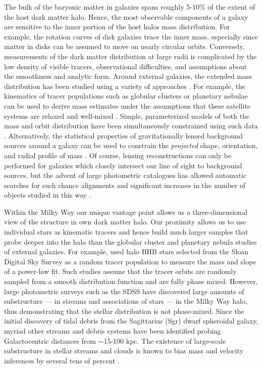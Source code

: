 \documentclass[letterpaper,12pt,preprint]{aastex}
\begin{document}
The bulk of the baryonic matter in galaxies spans roughly 5-10\% of the extent of the host dark matter halo. Hence, the most observable components of a galaxy are sensitive to the inner portion of the host halos mass distribution. For example, the rotation curves of disk galaxies trace the inner mass, especially since matter in disks can be assumed to move on nearly circular orbits. Conversely, measurements of the dark matter distribution at large radii is complicated by the low density of visible tracers, observational difficulties, and assumptions about the smoothness and analytic form. Around external galaxies, the extended mass distribution has been studied using a variety of approaches \citep[see][for a a complete and detailed review]{courteau13}. For example, the kinematics of tracer populations such as globular clusters or planetary nebulae can be used to derive mass estimates under the assumptions that these satellite systems are relaxed and well-mixed \citep[early investigations include][]{mendez01,cote03}. Simple, parameterized models of both the mass and orbit distribution have been simultaneously constrained using such data \citep[e.g.][]{napolitano11,deason12c}. 
Alternatively, the statistical properties of gravitationally lensed background sources around a galaxy can be used to constrain the \emph{projected} shape, orientation, and radial profile of mass \citep[see, for example, the Lens Structure and Dynamics Survey described in][]{koopmans02}. Of course, lensing reconstructions can only be performed for galaxies which closely intersect our line of sight to background sources, but the advent of large photometric catalogues has allowed automatic searches for such chance alignments and significant increases in the number of objects studied in this way \citep[e.g. the Sloan Lens ACS Survey, see][]{bolton06}.

Within the Milky Way our unique vantage point allows us a three-dimensional view of the structure in own dark matter halo. Our proximity allows us to use individual stars as kinematic tracers and hence build much larger samples that probe deeper into the halo than the globular cluster and planetary nebula studies of external galaxies. For example, \cite{deason12a} used halo BHB stars selected from the Sloan Digital Sky Survey \cite[SDSS;][]{york00} as a random tracer population to measure the mass and slope of a power-law fit. Such studies assume that the tracer orbits are randomly sampled from a smooth distribution function and are fully phase mixed. However, large photometric surveys such as the SDSS have discovered large amounts of substructure --- in streams and associations of stars --- in the Milky Way halo, thus demonstrating that the stellar distribution is not phase-mixed. Since the initial discovery of tidal debris from the Sagittarius (Sgr) dwarf spheroidal galaxy, myriad other streams and debris systems have been identified probing Galactocentric distances from $\sim$15-100 kpc. The existence of large-scale substructure in stellar streams and clouds is known to bias mass and velocity inferences by several tens of percent \citep{yencho06}.
\end{document}
